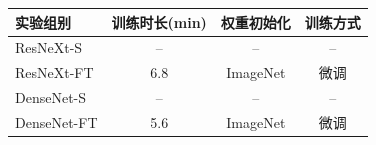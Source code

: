 \begin{tabular}{lccc}
\toprule
实验组别 & 训练时长(min) & 权重初始化 & 训练方式 \\
\midrule
ResNeXt-S & -- & -- & -- \\
ResNeXt-FT & 6.8 & ImageNet & 微调 \\
DenseNet-S & -- & -- & -- \\
DenseNet-FT & 5.6 & ImageNet & 微调 \\
\bottomrule
\end{tabular}
